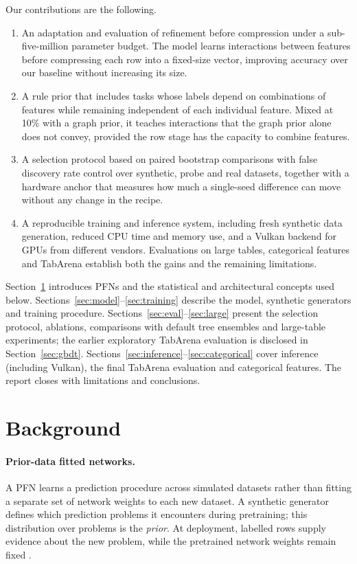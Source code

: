 \documentclass[11pt]{article}
\begin{document}
Our contributions are the following.
\begin{enumerate}
  \item An adaptation and evaluation of refinement before compression \cite{causilo} under a
  sub-five-million parameter budget. The model learns interactions between features before compressing
  each row into a fixed-size vector, improving accuracy over our baseline without increasing its size.
  \item A rule prior that includes tasks whose labels depend on combinations of features while
  remaining independent of each individual feature.
  Mixed at 10\% with a graph prior, it teaches interactions that the graph prior alone does not
  convey, provided the row stage has the capacity to combine features.
  \item A selection protocol based on paired bootstrap comparisons with
  false discovery rate control over synthetic, probe and real datasets, together with a hardware
  anchor that measures how much a single-seed difference can move without any change in the recipe.
  \item A reproducible training and inference system, including fresh synthetic data generation,
  reduced CPU time and memory use, and a Vulkan backend for GPUs from different vendors.
  Evaluations on large tables, categorical features and TabArena establish both the gains and
  the remaining limitations.
\end{enumerate}

Section~\ref{sec:background} introduces PFNs and the statistical and architectural concepts used below.
Sections~\ref{sec:model}--\ref{sec:training} describe the model, synthetic generators and training procedure.
Sections~\ref{sec:eval}--\ref{sec:large} present the selection protocol, ablations, comparisons with
default tree ensembles and large-table experiments; the earlier exploratory TabArena evaluation is
disclosed in Section~\ref{sec:gbdt}. Sections~\ref{sec:inference}--\ref{sec:categorical} cover inference
(including Vulkan), the final TabArena evaluation and categorical features. The report closes with limitations
and conclusions.

\section{Background}
\label{sec:background}

\paragraph{Prior-data fitted networks.} A PFN learns a prediction procedure across simulated
datasets rather than fitting a separate set of network weights to each new dataset. A synthetic
generator defines which prediction problems it encounters during pretraining; this distribution
over problems is the \emph{prior}. At deployment, labelled rows supply evidence about the new
problem, while the pretrained network weights remain fixed \cite{muller2022}.
\end{document}
